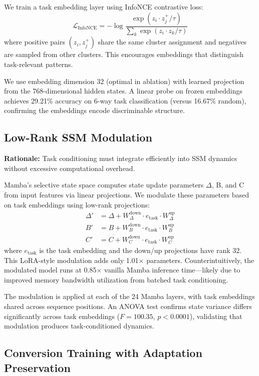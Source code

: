 We train a task embedding layer using InfoNCE contrastive loss:
\begin{equation}
\mathcal{L}_{\text{InfoNCE}} = -\log \frac{\exp(z_i \cdot z_j^+ / \tau)}{\sum_k \exp(z_i \cdot z_k / \tau)}
\end{equation}
where positive pairs $(z_i, z_j^+)$ share the same cluster assignment and negatives are sampled from other clusters. This encourages embeddings that distinguish task-relevant patterns.

We use embedding dimension 32 (optimal in ablation) with learned projection from the 768-dimensional hidden states. A linear probe on frozen embeddings achieves 29.21\% accuracy on 6-way task classification (versus 16.67\% random), confirming the embeddings encode discriminable structure.

\subsection{Low-Rank SSM Modulation}

\textbf{Rationale:} Task conditioning must integrate efficiently into SSM dynamics without excessive computational overhead.

Mamba's selective state space computes state update parameters $\Delta$, B, and C from input features via linear projections. We modulate these parameters based on task embeddings using low-rank projections:
\begin{align}
\Delta' &= \Delta + W_\Delta^{\text{down}} \cdot e_{\text{task}} \cdot W_\Delta^{\text{up}} \\
B' &= B + W_B^{\text{down}} \cdot e_{\text{task}} \cdot W_B^{\text{up}} \\
C' &= C + W_C^{\text{down}} \cdot e_{\text{task}} \cdot W_C^{\text{up}}
\end{align}
where $e_{\text{task}}$ is the task embedding and the down/up projections have rank 32. This LoRA-style modulation adds only 1.01$\times$ parameters. Counterintuitively, the modulated model runs at 0.85$\times$ vanilla Mamba inference time---likely due to improved memory bandwidth utilization from batched task conditioning.

The modulation is applied at each of the 24 Mamba layers, with task embeddings shared across sequence positions. An ANOVA test confirms state variance differs significantly across task embeddings ($F=100.35$, $p<0.0001$), validating that modulation produces task-conditioned dynamics.

\subsection{Conversion Training with Adaptation Preservation}

